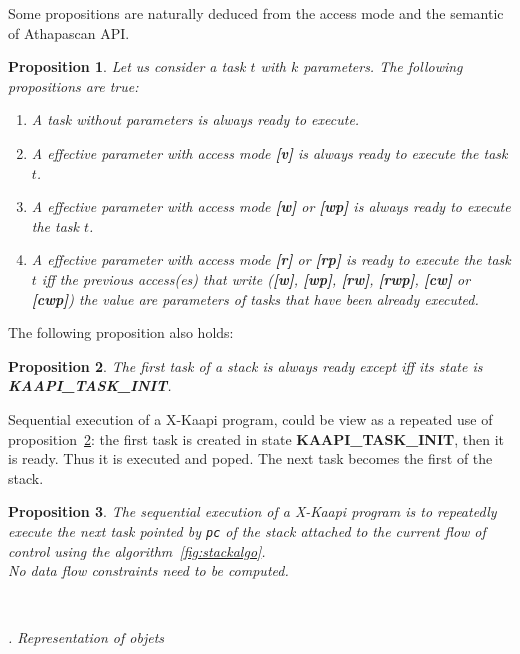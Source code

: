 \documentclass{report}
\newcommand{\kaapi}{\textsc{X}-Kaapi\xspace}
\renewcommand{\subsubsection}[1]{~\\ \addtocounter{subsubsection}{1} \noindent\textit{
\thesubsubsection. #1\\}}
\newtheorem{proposition}{Proposition}
\begin{document}
Some propositions are naturally deduced from the access mode and the semantic of Athapascan API.
\begin{proposition}
Let us consider a task $t$ with $k$ parameters. The following propositions are true: 
\begin{enumerate} \label{prop1}
\item \label{p1a} A task without parameters is always ready to execute.
\item \label{p1b} A effective parameter with access mode \textbf{[v]} is always ready to execute the task $t$.
\item \label{p1c} A effective parameter with access mode \textbf{[w]} or \textbf{[wp]} is always ready to execute the task $t$.
\item \label{p1d} A effective parameter with access mode \textbf{[r]} or \textbf{[rp]} is ready to execute the task $t$ iff the previous access(es) 
that write (\textbf{[w]}, \textbf{[wp]}, \textbf{[rw]}, \textbf{[rwp]}, \textbf{[cw]} or \textbf{[cwp]}) the value are parameters of tasks that have been already executed. 
\end{enumerate}
\end{proposition}

The following proposition also holds:
\begin{proposition}\label{prop2} 
The first task of a stack is always ready except iff its state is \textbf{KAAPI\_TASK\_INIT}.
\end{proposition}

Sequential execution of a \kaapi program, could be view as a repeated use of proposition~\ref{prop2}: the first task is created in state \textbf{KAAPI\_TASK\_INIT}, then it is ready. Thus it is executed and poped. The next task becomes the first of the stack.
\begin{proposition}
The sequential execution of a \kaapi program is to repeatedly execute the next task pointed by \texttt{pc} of the stack attached to the current flow of control using the algorithm~\ref{fig:stackalgo}.\\
No data flow constraints need to be computed.
\end{proposition}


\subsubsection{Representation of objets}
\end{document}

